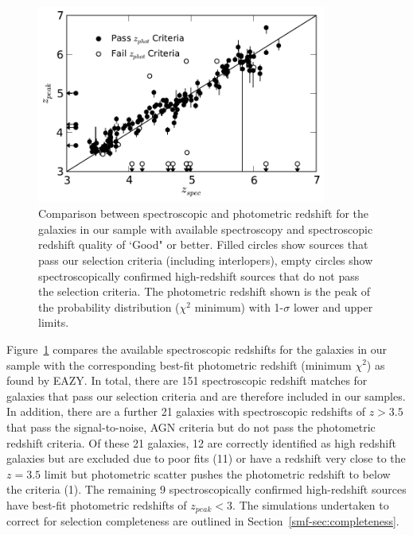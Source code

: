 \begin{figure}
\centering
\includegraphics[width=95mm]{plots/fig1.pdf}
\caption[Comparison of photometric redshifts with available spectroscopic redshifts.]{Comparison between spectroscopic and photometric redshift for the galaxies in our sample with available spectroscopy and spectroscopic redshift quality of `Good" or better. Filled circles show sources that pass our selection criteria (including interlopers), empty circles show spectroscopically confirmed high-redshift sources that do not pass the selection criteria. The photometric redshift shown is the peak of the probability distribution ($\chi^2$ minimum) with 1-$\sigma$ lower and upper limits.}
\label{smf-fig:specz}
\end{figure}

Figure~\ref{smf-fig:specz} compares the available spectroscopic redshifts for the galaxies in our sample with the corresponding best-fit photometric redshift (minimum $\chi^2$) as found by EAZY. In total, there are 151 spectroscopic redshift matches for galaxies that pass our selection criteria and are therefore included in our samples. In addition, there are a further 21 galaxies with spectroscopic redshifts of $z > 3.5$ that pass the signal-to-noise, AGN criteria but do not pass the photometric redshift criteria. Of these 21 galaxies, 12 are correctly identified as high redshift galaxies but are excluded due to poor fits (11) or have a redshift very close to the $z = 3.5$ limit but photometric scatter pushes the photometric redshift to below the criteria (1). The remaining 9 spectroscopically confirmed high-redshift sources have best-fit photometric redshifts of $z_{peak} < 3$. The simulations undertaken to correct for selection completeness are outlined in Section~\ref{smf-sec:completeness}.

